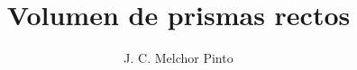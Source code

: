 \documentclass[12pt]{guia}
\title{Volumen de prismas rectos}
\author{J. C. Melchor Pinto}
\begin{document}
\pagestyle{headandfoot}
\addpoints
\INFO
\printanswers
\begin{questions}
    
    
    \newpage
    
    
    \newpage
    

\end{questions}

\end{document}

